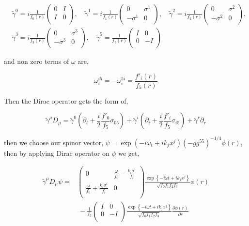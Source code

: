 \begin{align}
   &\tilde{\gamma}^0 = i\frac{1}{f_0(r)}\begin{pmatrix} 0 & I \\ I & 0 \\ \end{pmatrix}, \quad
   \tilde{\gamma}^1  = i\frac{1}{f_1(r)}\begin{pmatrix} 0 & \sigma^1 \\ -\sigma^1 & 0 \\ \end{pmatrix}, \quad
   \tilde{\gamma}^2  = i\frac{1}{f_2(r)}\begin{pmatrix} 0 & \sigma^2 \\ -\sigma^2 & 0 \\ \end{pmatrix}, \nonumber\\
   &\tilde{\gamma}^3 = i\frac{1}{f_3(r)}\begin{pmatrix} 0 & \sigma^3 \\ -\sigma^3 & 0 \\ \end{pmatrix}, \quad
   \tilde{\gamma}^5  =  \frac{1}{f_5(r)}\begin{pmatrix} I & 0 \\ 0 & -I \\ \end{pmatrix}
\end{align}

and non zero terms of $\omega$ are,

\begin{equation}
   \omega^{i5}_i = -\omega^{5i}_i = \frac{f'_i(r)}{f_5(r)} 
\end{equation}

Then the Dirac operator gets the form of,

\begin{equation}
   \tilde{\gamma}^{\mu}D_{\mu} = \tilde{\gamma}^0 \left(\partial_t + \frac{i}{2}\frac{f'_0}{f_5}\sigma_{05}\right) + \tilde{\gamma}^i \left(\partial_i + \frac{i}{2}\frac{f'_i}{f_5}\sigma_{i5}\right) + \tilde{\gamma}^r\partial_r
\end{equation}

then we choose our spinor vector, $\psi = \exp(-i\omega_t + ik_jx^j)(-gg^{55})^{-1/4}\phi(r)$, then by applying Dirac operator on $\psi$ we get,

\begin{align}
   \tilde{\gamma}^{\mu}D_{\mu}\psi =& \begin{pmatrix} 0 & \frac{\omega}{f_0} - \frac{k_i\sigma^i}{f_i} \\ \frac{\omega}{f_0} + \frac{k_i\sigma^i}{f_i} & 0 \\ \end{pmatrix}\frac{\exp\left\{-i\omega t + ik_jx^j\right\}}{\sqrt{f_0f_1f_2f_3}}\phi(r) \nonumber\\
    & ~ - \frac{1}{f_5} \begin{pmatrix} I & 0 \\ 0 & -I \\ \end{pmatrix} \frac{\exp\left\{-i\omega t + ik_jx^j\right\}}{\sqrt{f_0f_1f_2f_3}}\frac{\partial\phi(r)}{\partial r}
\end{align}

